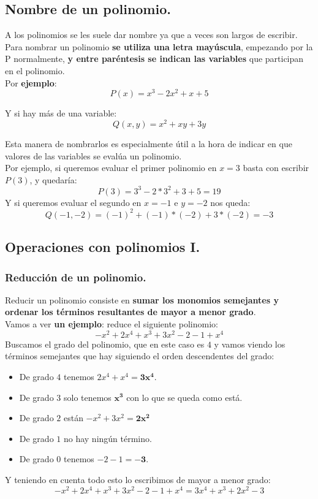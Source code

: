 \documentclass[a4paper,11pt,answers]{exam}
\begin{document}
  \subsection{Nombre de un polinomio.}
  A los polinomios se les suele dar nombre ya que a veces son largos de escribir.\\
  Para nombrar un polinomio \textbf{se utiliza una letra mayúscula}, empezando por la P normalmente, \textbf{y entre paréntesis se indican las variables} que participan en el polinomio.\\

  Por \textbf{ejemplo}:
  \[P(x) = x^3 - 2x^2 + x + 5\]

  Y si hay más de una variable:
  \[Q(x,y) = x^2 + xy + 3y\]

  Esta manera de nombrarlos es especialmente útil a la hora de indicar en que valores de las variables se evalúa un polinomio.\\
  Por ejemplo, si queremos evaluar el primer polinomio en $x=3$ basta con escribir $P(3)$, y quedaría:
  \[P(3) = 3^3 - 2*3^2 +3 + 5 = 19\]
  Y si queremos evaluar el segundo en $x=-1$ e $y=-2$ nos queda:
  \[  Q(-1, -2) = (-1)^2 + (-1)*(-2) + 3*(-2) = -3\]
  \subsection{Operaciones con polinomios I.}
  \subsubsection{Reducción de un polinomio.} \label{red_pol}
  Reducir un polinomio consiste en \textbf{sumar los monomios semejantes y ordenar los términos resultantes de mayor a menor grado}.\\

  Vamos a ver \textbf{un ejemplo}: reduce el siguiente polinomio:
  \[-x^2 + 2x^4 + x^3 +3x^2 - 2 - 1 + x^4\]
  Buscamos el grado del polinomio, que en este caso es $4$ y vamos viendo los términos semejantes que hay siguiendo el orden descendentes del grado:
  \begin{itemize}
  \item De grado $4$ tenemos $2x^4 + x^4 = \boldsymbol{3x^4}$.
  \item De grado $3$ solo tenemos $\boldsymbol{x^3}$ con lo que se queda como está.
  \item De grado $2$ están $-x^2 + 3x^2 = \boldsymbol{2x^2}$
  \item De grado $1$ no hay ningún término.
  \item De grado $0$ tenemos $-2-1=\boldsymbol{-3}$.
  \end{itemize}
  Y teniendo en cuenta todo esto lo escribimos de mayor a menor grado:
  \[-x^2 + 2x^4 + x^3 +3x^2 - 2 - 1 + x^4 = 3x^4 + x^3 + 2x^2 - 3\]
\end{document}
